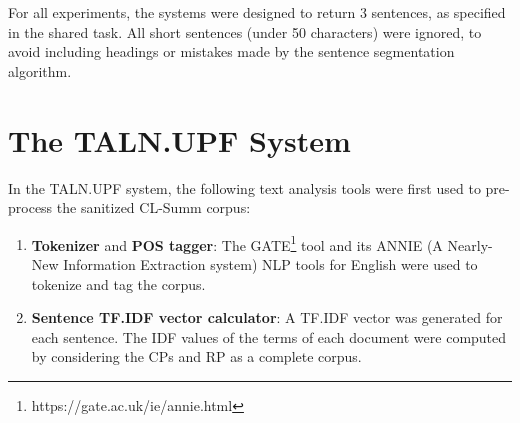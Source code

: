 \documentclass[11pt]{article}
\begin{document}
For all experiments, the systems were designed to return 3 sentences, as specified 
in the shared task. All short sentences (under 50 characters) were ignored, to 
avoid including headings or mistakes made by the sentence segmentation algorithm.


\section{The TALN.UPF System}

In the TALN.UPF system, the following text analysis tools were first used to pre-process the sanitized CL-Summ corpus:
\begin{enumerate}
\item \textbf{Tokenizer} and \textbf{POS tagger}: The GATE\footnote{https://gate.ac.uk/ie/annie.html} tool and its 
ANNIE (A Nearly-New Information Extraction system) NLP tools for English were used to tokenize and tag the corpus.
\vspace{-.3cm}
\item \textbf{Sentence TF.IDF vector calculator}: A TF.IDF vector was generated for each sentence. The IDF values of the terms of each document were computed by considering the CPs and RP as a complete corpus.
\end{enumerate}
\end{document}
